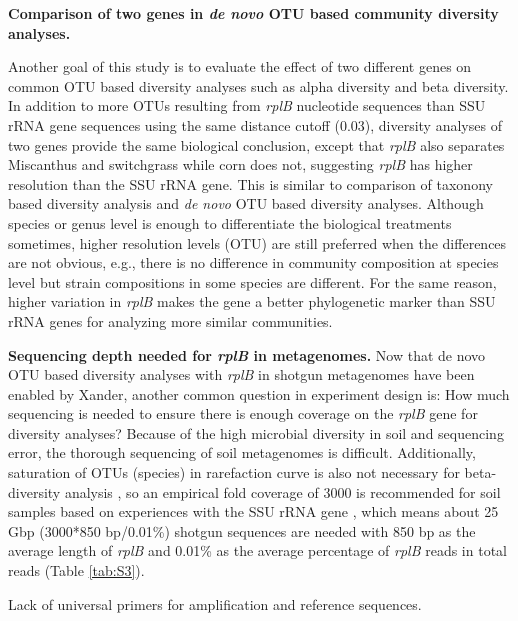 \documentclass[]{msu-thesis}
\begin{document}
\textbf{Comparison of two genes in \textit{de novo} OTU based community diversity analyses. }

Another goal of this study is to evaluate the effect of two different genes on common OTU based diversity analyses such as alpha diversity and beta diversity. In addition to more OTUs resulting from \textit{rplB} nucleotide sequences than SSU rRNA gene sequences using the same distance cutoff (0.03), diversity analyses of two genes provide the same biological conclusion, except that \textit{rplB} also separates Miscanthus and switchgrass while corn does not, suggesting \textit{rplB} has higher resolution than the SSU rRNA gene. This is similar to comparison of taxonony based diversity analysis and \textit{de novo} OTU based diversity analyses. Although species or genus level is enough to differentiate the biological treatments sometimes, higher resolution levels (OTU) are still preferred when the differences are not obvious, e.g., there is no difference in community composition at species level but strain compositions in some species are different. For the same reason, higher variation in \textit{rplB} makes the gene a better phylogenetic marker than SSU rRNA genes for analyzing more similar communities.


\textbf{Sequencing depth needed for \textit{rplB} in metagenomes. }
Now that de novo OTU based diversity analyses with \textit{rplB} in shotgun metagenomes have been enabled by Xander, another common question in experiment design is: How much sequencing is needed to ensure there is enough coverage on the \textit{rplB} gene for diversity analyses? Because of the high microbial diversity in soil and sequencing error, the thorough sequencing of soil metagenomes is difficult. Additionally, saturation of OTUs (species) in rarefaction curve is also not necessary for beta-diversity analysis \cite{caporaso_ultra-high-throughput_2012}, so an empirical fold coverage of 3000 is recommended for soil samples based on experiences with the SSU rRNA gene \cite{guo_microbial_2015}, which means about 25 Gbp (3000*850 bp/0.01\%) shotgun sequences are needed with 850 bp as the average length of \textit{rplB} and 0.01\% as the average percentage of \textit{rplB} reads in total reads (Table \ref{tab:S3}).


{Lack of universal primers for amplification and reference sequences. }
\end{document}
